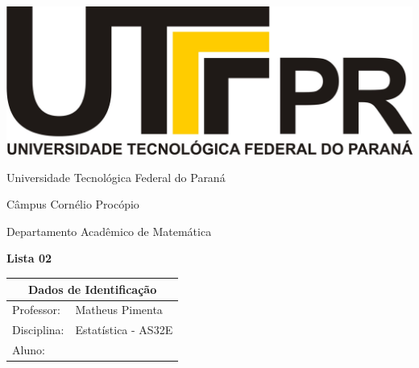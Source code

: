 \documentclass[oneside,a4paper,12pt]{article}
\newcommand{\universidade}{Universidade Tecnológica Federal do Paraná}
\newcommand{\centro}{Câmpus Cornélio Procópio}
\newcommand{\departamento}{Departamento Acadêmico de Matemática}
\newcommand{\curso}{Análise e Desenvolvimento de Sistemas}
\newcommand{\professores}{Matheus Pimenta}
\newcommand{\disciplina}{Estatística - AS32E}
\begin{document}
	\pagestyle{empty}
	
	\begin{center}
		\includegraphics[width=\linewidth/8]{logo.jpg}%
	 	\vspace{2pt} 	
		
		\universidade
		\par
		\centro
		\par
		\departamento
		\par
		\par
		\vspace{12pt}
		\LARGE \textbf{Lista 02}
		
	\end{center}
	
	\vspace{12pt}
	
	\begin{tabular}{ |l|p{12cm}| }
		
		\hline
		\multicolumn{2}{|c|}{\textbf{Dados de Identificação}} \\
		\hline
		Professor:         &    \professores           \\
		\hline
		Disciplina:        &    \disciplina          \\
		\hline
		Aluno:             &                   \\
		\hline
		
	\end{tabular}
	\vspace{6pt}
	
\end{document}
